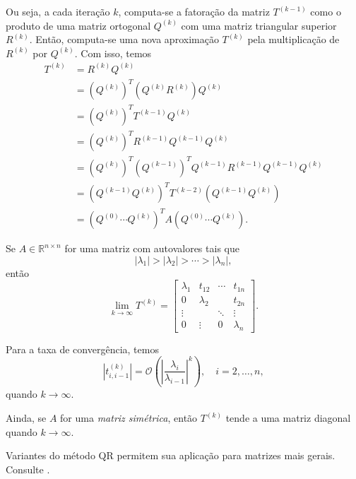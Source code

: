 Ou seja, a cada iteração $k$, computa-se a fatoração da matriz $T^{(k-1)}$ como o produto de uma matriz ortogonal $Q^{(k)}$ com uma matriz triangular superior $R^{(k)}$. Então, computa-se uma nova aproximação $T^{(k)}$ pela multiplicação de $R^{(k)}$ por $Q^{(k)}$. Com isso, temos
\begin{align}
  T^{(k)} &= R^{(k)}Q^{(k)}\\
          &= (Q^{(k)})^T(Q^{(k)}R^{(k)})Q^{(k)}\\
          &= (Q^{(k)})^TT^{(k-1)}Q^{(k)}\\
          &= (Q^{(k)})^TR^{(k-1)}Q^{(k-1)}Q^{(k)}\\
          &= (Q^{(k)})^T(Q^{(k-1)})^TQ^{(k-1)}R^{(k-1)}Q^{(k-1)}Q^{(k)}\\
          &= (Q^{(k-1)}Q^{(k)})^TT^{(k-2)}(Q^{(k-1)}Q^{(k)})\\
          &=(Q^{(0)}\cdots Q^{(k)})^TA(Q^{(0)}\cdots Q^{(k)}).
\end{align}

\begin{obs}
  Se $A\in\mathbb{R}^{n\times n}$ for uma matriz com autovalores tais que
  \begin{equation}
    |\lambda_1| > |\lambda_2| > \cdots > |\lambda_n|,
  \end{equation}
  então
  \begin{equation}
    \lim_{k\to\infty} T^{(k)} =   \begin{bmatrix}
    \lambda_1 & t_{12} & \cdots & t_{1n}\\
    0 & \lambda_2 & & t_{2n}\\
    \vdots & & \ddots & \vdots\\
    0 & \vdots & 0 & \lambda_n
  \end{bmatrix}.
\end{equation}

  Para a taxa de convergência, temos
  \begin{equation}
    |t^{(k)}_{i,i-1}| = \mathcal{O}\left(\left|\frac{\lambda_i}{\lambda_{i-1}}\right|^k\right),\quad i=2,\dotsc,n,
  \end{equation}
  quando $k\to\infty$.

  Ainda, se $A$ for uma \emph{matriz simétrica}, então $T^{(k)}$ tende a uma matriz diagonal quando $k\to\infty$.
\end{obs}

\begin{obs}
  Variantes do método QR permitem sua aplicação para matrizes mais gerais. Consulte \cite{Golub2013a}.
\end{obs}

